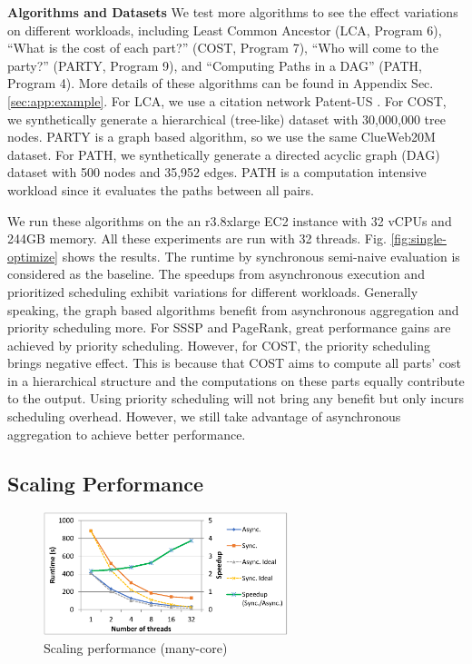 \noindent\textbf{Algorithms and Datasets}
We test more algorithms to see the effect variations on different workloads, including Least Common Ancestor (LCA, Program 6), ``What is the cost of each part?'' (COST, Program 7), ``Who will come to the party?'' (PARTY, Program 9), and ``Computing Paths in a DAG'' (PATH, Program 4). More details of these algorithms can be found in Appendix Sec. \ref{sec:app:example}. For LCA, we use a citation network Patent-US \cite{konect}. For COST, we synthetically generate a hierarchical (tree-like) dataset with 30,000,000 tree nodes. PARTY is a graph based algorithm, so we use the same ClueWeb20M dataset. For PATH, we synthetically generate a directed acyclic graph (DAG) dataset with 500 nodes and 35,952 edges. PATH is a computation intensive workload since it evaluates the paths between all pairs.


We run these algorithms on the an r3.8xlarge EC2 instance with 32 vCPUs and 244GB memory. All these experiments are run with 32 threads. Fig. \ref{fig:single-optimize} shows the results. The runtime by synchronous semi-naive evaluation is considered as the baseline. The speedups from asynchronous execution and prioritized scheduling exhibit variations for different workloads. Generally speaking, the graph based algorithms benefit from asynchronous aggregation and priority scheduling more. For SSSP and PageRank, great performance gains are achieved by priority scheduling. However, for COST, the priority scheduling brings negative effect. This is because that COST aims to compute all parts' cost in a hierarchical structure and the computations on these parts equally contribute to the output. Using priority scheduling will not bring any benefit but only incurs scheduling overhead. However, we still take advantage of asynchronous aggregation to achieve better performance.


 \subsection{Scaling Performance}
 \label{sec:expr:scale}
 
 \begin{figure}[!t]
 	\centering
 	\includegraphics[width=2.8in]{fig/single-scalability}
 	\vspace{-0.1in}
 	\caption{Scaling performance (many-core)}
 	\label{fig:single-scalability}
 \end{figure}
 
